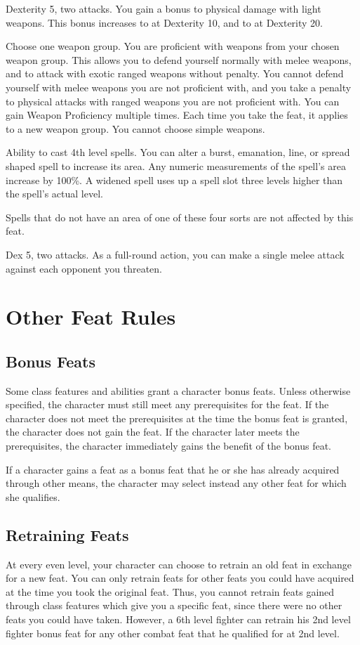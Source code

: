 \featpres Dexterity 5, two attacks.
\featben You gain a  bonus to physical damage with light weapons.
This bonus increases to  at Dexterity 10, and to  at Dexterity 20.

Choose one weapon group.
\featben You are proficient with weapons from your chosen weapon group.
This allows you to defend yourself normally with melee weapons, and to attack with exotic ranged weapons without penalty.
You cannot defend yourself with melee weapons you are not proficient with, and you take a  penalty to physical attacks with ranged weapons you are not proficient with.
You can gain Weapon Proficiency multiple times.
Each time you take the feat, it applies to a new weapon group.
You cannot choose simple weapons.

\featpre Ability to cast 4th level spells.
\featben You can alter a burst, emanation, line, or spread shaped spell to increase its area.
Any numeric measurements of the spell's area increase by 100\%.
A widened spell uses up a spell slot three levels higher than the spell's actual level.
\par Spells that do not have an area of one of these four sorts are not affected by this feat.

\featpres Dex 5, two attacks.
\featben As a full-round action, you can make a single melee attack against each opponent you threaten.

\section{Other Feat Rules}

\subsection{Bonus Feats}
Some class features and abilities grant a character bonus feats.
Unless otherwise specified, the character must still meet any prerequisites for the feat.
If the character does not meet the prerequisites at the time the bonus feat is granted, the character does not gain the feat.
If the character later meets the prerequisites, the character immediately gains the benefit of the bonus feat.

If a character gains a feat as a bonus feat that he or she has already acquired through other means, the character may select instead any other feat for which she qualifies.

\subsection{Retraining Feats}
At every even level, your character can choose to retrain an old feat in exchange for a new feat.
You can only retrain feats for other feats you could have acquired at the time you took the original feat.
Thus, you cannot retrain feats gained through class features which give you a specific feat, since there were no other feats you could have taken.
However, a 6th level fighter can retrain his 2nd level fighter bonus feat for any other combat feat that he qualified for at 2nd level.
